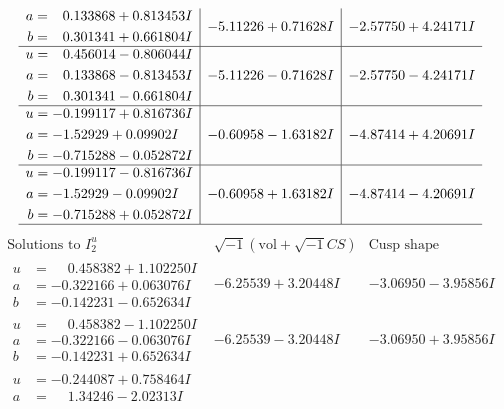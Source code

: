 \documentclass[1p]{elsarticle_modified}
\theoremstyle{definition}
\newcommand{\I}{\sqrt{-1}}
\begin{document}
$$\begin{array}{c|c|c}
\begin{aligned}
a &= \phantom{-}0.133868 + 0.813453 I \\
b &= \phantom{-}0.301341 + 0.661804 I\end{aligned}
 & -5.11226 + 0.71628 I & -2.57750 + 4.24171 I \\ \hline\begin{aligned}
u &= \phantom{-}0.456014 - 0.806044 I \\
a &= \phantom{-}0.133868 - 0.813453 I \\
b &= \phantom{-}0.301341 - 0.661804 I\end{aligned}
 & -5.11226 - 0.71628 I & -2.57750 - 4.24171 I \\ \hline\begin{aligned}
u &= -0.199117 + 0.816736 I \\
a &= -1.52929 + 0.09902 I \\
b &= -0.715288 - 0.052872 I\end{aligned}
 & -0.60958 - 1.63182 I & -4.87414 + 4.20691 I \\ \hline\begin{aligned}
u &= -0.199117 - 0.816736 I \\
a &= -1.52929 - 0.09902 I \\
b &= -0.715288 + 0.052872 I\end{aligned}
 & -0.60958 + 1.63182 I & -4.87414 - 4.20691 I\\
 \hline 
 \end{array}$$\newpage$$\begin{array}{c|c|c}  
\text{Solutions to }I^u_{2}& \I (\text{vol} + \sqrt{-1}CS) & \text{Cusp shape}\\
 \hline 
\begin{aligned}
u &= \phantom{-}0.458382 + 1.102250 I \\
a &= -0.322166 + 0.063076 I \\
b &= -0.142231 - 0.652634 I\end{aligned}
 & -6.25539 + 3.20448 I & -3.06950 - 3.95856 I \\ \hline\begin{aligned}
u &= \phantom{-}0.458382 - 1.102250 I \\
a &= -0.322166 - 0.063076 I \\
b &= -0.142231 + 0.652634 I\end{aligned}
 & -6.25539 - 3.20448 I & -3.06950 + 3.95856 I \\ \hline\begin{aligned}
u &= -0.244087 + 0.758464 I \\
a &= \phantom{-}1.34246 - 2.02313 I \\

\end{aligned}
\end{array}$$
\end{document}
